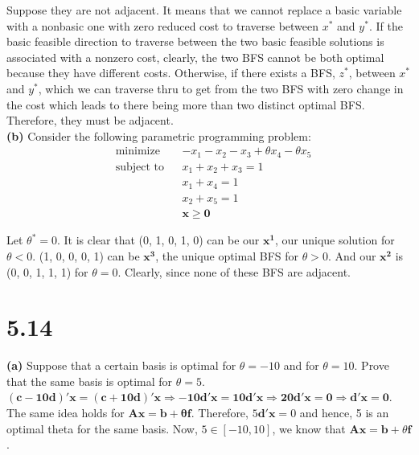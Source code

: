 \documentclass{article}
\begin{document}
\noindent
Suppose they are not adjacent.  It means that we cannot replace a basic variable with a nonbasic one with zero reduced cost to traverse between $x^*$ and $y^*$.  If the basic feasible direction to traverse between the two basic feasible solutions is associated with a nonzero cost, clearly, the two BFS cannot be both optimal because they have different costs.  Otherwise,  if there exists a BFS, $z^*$, between $x^*$ and $y^*$, which we can traverse thru to get from the two BFS with zero change in the cost which leads to there being more than two distinct optimal BFS.  Therefore, they must be adjacent. \\

\noindent
\textbf{(b)}
Consider the following parametric programming problem: \\
\begin{equation*}
\begin{aligned}
& \text{minimize} && -x_1 - x_2 - x_3 + \theta x_4 - \theta x_5 \\
& \text{subject to} &&  x_1 + x_2 + x_3 = 1\\
& & & x_1 + x_4 = 1 \\
& & & x_2 + x_5 = 1 \\
& & &\mathbf{x \geq 0}
\end{aligned}
\end{equation*}

\noindent
Let $\theta^* = 0$.  It is clear that (0, 1, 0, 1, 0) can be our $\mathbf{x^1}$, our unique solution for $\theta < 0$.   (1, 0, 0, 0, 1) can be $\mathbf{x^3}$, the unique optimal BFS for $\theta > 0$.   And our $\mathbf{x^2}$ is (0, 0, 1, 1, 1) for $\theta = 0$.  Clearly, since none of these BFS are adjacent. \\

\section*{5.14}
\textbf{(a)} Suppose that a certain basis is optimal for $\theta = -10$ and for $\theta = 10$.  Prove that the same basis is optimal for $\theta = 5$.  \\

\noindent
$\mathbf{(c - 10d)' x = (c + 10d)' x \Rightarrow -10d'x = 10d'x \Rightarrow 20d'x = 0 \Rightarrow d'x = 0}$.  The same idea holds for $\mathbf{Ax = b + \theta f}$.  Therefore, $5 \mathbf{d'x} = 0$ and hence, 5 is an optimal theta for the same basis.  
Now,  $5 \in [-10, 10]$, we know that $\mathbf{Ax = b} + \theta \mathbf{f}$. \\
\end{document}
